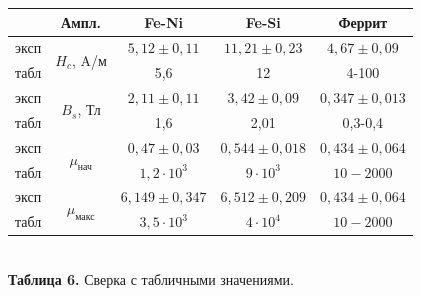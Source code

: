\documentclass[a4paper, 12pt]{article}%
\begin{document}
\begin{center}
\begin{tabular}{|c|c|c|c|c|}
\hline
 & Ампл. & Fe-Ni & Fe-Si & Феррит \\ \hline
эксп & \multirow{2}{*}{$H_c$, A/м} & $5,12 \pm 0,11$ & $11,21 \pm 0,23$ & $4,67 \pm 0,09$ \\ \cline{1-1} \cline{3-5} 
табл &  & 5,6 & 12 & 4-100 \\ \hline
эксп & \multirow{2}{*}{$B_s$, Тл} & $2,11 \pm 0,11$ & $3,42 \pm 0,09$ & $0,347 \pm 0,013$ \\ \cline{1-1} \cline{3-5} 
табл &  & 1,6 & 2,01 & 0,3-0,4 \\ \hline
эксп & \multirow{2}{*}{$\mu_{\text{нач}}$} & $0,47 \pm 0,03$ & $0,544 \pm 0,018$ & $0,434 \pm 0,064$ \\ \cline{1-1} \cline{3-5} 
табл &  & $1,2\cdot 10^3$ & $9\cdot 10^3$ & $10-2000$ \\ \hline
эксп & \multirow{2}{*}{$\mu_{\text{макс}}$} & $6,149 \pm 0,347$ & $6,512 \pm 0,209$ & $0,434 \pm 0,064$ \\ \cline{1-1} \cline{3-5} 
табл &  & $3,5\cdot 10^3$ & $4\cdot 10^4$ & $10-2000$ \\ \hline
\end{tabular}\\
\textbf{Таблица 6.} Сверка с табличными значениями.
\end{center}
\end{document}
